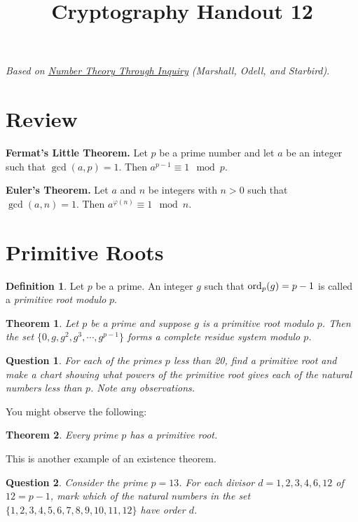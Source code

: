 \documentclass[12pt]{amsart}
\makeatletter
\def\subtitle#1{\gdef\@subtitle{#1}}
\def\@subtitle{}
\theoremstyle{plain}
\newtheorem{thm}{Theorem}
\newtheorem{quest}{Question}
\theoremstyle{definition}
\newtheorem*{defn}{Definition}
\theoremstyle{remark}
\makeatother
\begin{document}
\onehalfspacing

\title[]{Cryptography Handout 12}
\subtitle{Primitive Roots}
\maketitle

\begin{center}
\emph{Based on \underline{Number Theory Through Inquiry} (Marshall, Odell, and Starbird)}.
\end{center}

\section{Review}

\noindent\textbf{Fermat's Little Theorem.} Let $p$ be a prime number and let $a$ be an integer such that $\gcd(a,p) = 1$. Then $a^{p-1} \equiv 1 \mod p$.

\noindent\textbf{Euler's Theorem.} Let $a$ and $n$ be integers with $n > 0$ such that $\gcd(a,n) = 1$. Then $a^{\varphi(n)} \equiv 1 \mod n$.

\section{Primitive Roots}
\begin{defn}
Let $p$ be a prime.  An integer $g$ such that $\textup{ord}_p(g) = p-1$ is called a \emph{primitive root modulo} $p$.
\end{defn}

\begin{thm}
Let $p$ be a prime and suppose $g$ is a primitive root modulo $p$.  Then the set $\{0,g,g^2,g^3, \cdots, g^{p-1}\}$ forms a complete residue system modulo $p$.
\end{thm}

\begin{quest}
For each of the primes $p$ less than 20, find a primitive root and make a chart showing what powers of the primitive root gives each of the natural numbers less than $p$.  Note any observations.
\end{quest}

\newpage
You might observe the following:
\begin{thm}
Every prime $p$ has a primitive root.
\end{thm}

This is another example of an existence theorem.

\begin{quest}
Consider the prime $p = 13$.  For each divisor $d = 1, 2, 3, 4, 6, 12$ of $12 = p-1$, mark which of the natural numbers in the set $\{1,2,3,4,5,6,7,8,9,10,11,12\}$ have order $d$.
\end{quest}
\end{document}
